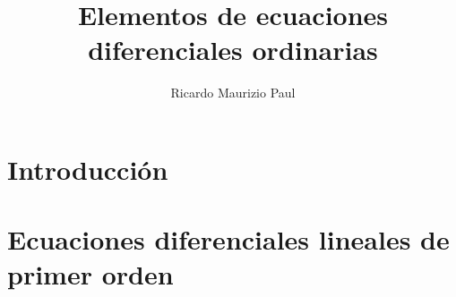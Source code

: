 \documentclass{report}
\title{Elementos de ecuaciones diferenciales ordinarias}
\author{Ricardo Maurizio Paul}
\begin{document}
\maketitle
\tableofcontents

\chapter{Introducción}


\chapter{Ecuaciones diferenciales lineales de primer orden}

\end{document}
